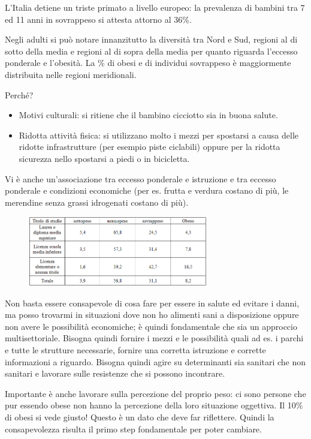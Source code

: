 L'Italia detiene un triste primato a livello europeo: la prevalenza di
bambini tra 7 ed 11 anni in sovrappeso si attesta attorno al 36\%.

Negli adulti si può notare innanzitutto la diversità tra Nord e Sud,
regioni al di sotto della media e regioni al di sopra della media per
quanto riguarda l'eccesso ponderale e l'obesità. La \% di obesi e di
individui sovrappeso è maggiormente distribuita nelle regioni
meridionali.

Perché?

\begin{itemize}
\item
  Motivi culturali: si ritiene che il bambino cicciotto sia in buona
  salute.
\item
  Ridotta attività fisica: si utilizzano molto i mezzi per spostarsi a
  causa delle ridotte infrastrutture (per esempio piste ciclabili)
  oppure per la ridotta sicurezza nello spostarsi a piedi o in
  bicicletta.
\end{itemize}

Vi è anche un'associazione tra eccesso ponderale e istruzione e tra
eccesso ponderale e condizioni economiche (per es. frutta e verdura
costano di più, le merendine senza grassi idrogenati costano di più).

\begin{figure}[!ht]
\centering
	\includegraphics[width=0.7\textwidth]{20/image11.png}
	\end{figure}

Non basta essere consapevole di cosa fare per essere in salute ed
evitare i danni, ma posso trovarmi in situazioni dove non ho alimenti
sani a disposizione oppure non avere le possibilità economiche; è quindi
fondamentale che sia un approccio multisettoriale. Bisogna quindi
fornire i mezzi e le possibilità quali ad es. i parchi e tutte le
strutture necessarie, fornire una corretta istruzione e corrette
informazioni a riguardo. Bisogna quindi agire su determinanti sia
sanitari che non sanitari e lavorare sulle resistenze che si possono
incontrare.

Importante è anche lavorare sulla percezione del proprio peso: ci sono
persone che pur essendo obese non hanno la percezione della loro
situazione oggettiva. Il 10\% di obesi si vede giusto! Questo è un dato
che deve far riflettere. Quindi la consapevolezza risulta il primo step
fondamentale per poter cambiare.

